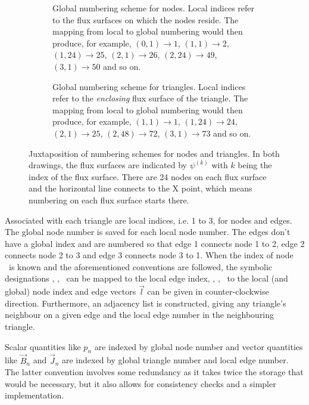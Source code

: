 \savebox{\imagebox}{}%
\begin{figure}[bth]
  \centering
  \begin{subfigure}[t]{0.48\textwidth}
    \centering
    \usebox{\imagebox}
    \caption{Global numbering scheme for nodes. Local indices refer to the flux surfaces on which the nodes reside. The mapping from local to global numbering would then produce, for example, $(0, 1) \to 1$, $(1, 1) \to 2$, $(1, 24) \to 25$, $(2, 1) \to 26$, $(2, 24) \to 49$, $(3, 1) \to 50$ and so on.}
    \label{fig:numbering_nodes}
  \end{subfigure}
  \quad
  \begin{subfigure}[t]{0.48\textwidth}
    \centering
    \raisebox{\dimexpr\ht\imagebox-\height}{}
    \caption{Global numbering scheme for triangles. Local indices refer to the \emph{enclosing} flux surface of the triangle. The mapping from local to global numbering would then produce, for example, $(1, 1) \to 1$, $(1, 24) \to 24$, $(2, 1) \to 25$, $(2, 48) \to 72$, $(3, 1) \to 73$ and so on.}
    \label{fig:numbering_triangles}
  \end{subfigure}
  \caption{Juxtaposition of numbering schemes for nodes and triangles. In both drawings, the flux surfaces are indicated by $\psi^{(k)}$ with $k$ being the index of the flux surface. There are 24 nodes on each flux surface and the horizontal line connects to the X point, which means numbering on each flux surface starts there.}
  \label{fig:numbering_scheme}
\end{figure}

Associated with each triangle are local indices, i.e. 1 to 3, for nodes and edges. The global node number is saved for each local node number. The edges don't have a global index and are numbered so that edge 1 connects node 1 to 2, edge 2 connects node 2 to 3 and edge 3 connects node 3 to 1. When the index of node \vfs\ is known and the aforementioned conventions are followed, the symbolic designations \fs, \inw, \out\ can be mapped to the local edge index, \vfs, \vinw, \vout\ to the local (and global) node index and edge vectors $\vec{l}$ can be given in counter-clockwise direction. Furthermore, an adjacency list is constructed, giving any triangle's neighbour on a given edge and the local edge number in the neighbouring triangle.

Scalar quantities like $p_{n}$ are indexed by global node number and vector quantities like $\vec{B}_{n}$ and $\vec{J}_{n}$ are indexed by global triangle number and local edge number. The latter convention involves some redundancy as it takes twice the storage that would be necessary, but it also allows for consistency checks and a simpler implementation.

